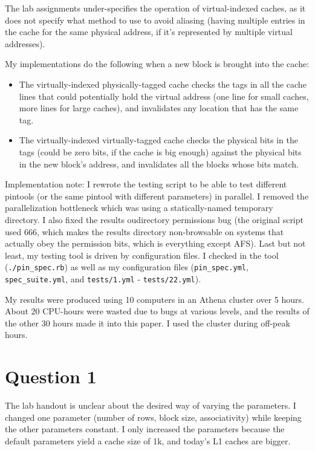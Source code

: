 The lab assignments under-specifies the operation of virtual-indexed caches, as
it does not specify what method to use to avoid aliasing (having multiple
entries in the cache for the same physical address, if it's represented by
multiple virtual addresses).

My implementations do the following when a new block is brought into the cache:
\begin{itemize}
  \item The virtually-indexed physically-tagged cache checks the tags in all
  the cache lines that could potentially hold the virtual address (one line for
  small caches, more lines for large caches), and invalidates any location that
  has the same tag.
  \item The virtually-indexed virtually-tagged cache checks the physical bits
  in the tags (could be zero bits, if the cache is big enough) against the
  physical bits in the new block's address, and invalidates all the blocks
  whose bits match.
\end{itemize}

Implementation note: I rewrote the testing script to be able to test different
pintools (or the same pintool with different parameters) in parallel. I removed
the parallelization bottleneck which was using a statically-named temporary
directory. I also fixed the results oudirectory permissions bug (the original
script used 666, which makes the results directory non-browsable on systems
that actually obey the permission bits, which is everything except AFS). Last
but not least, my testing tool is driven by configuration files. I checked in
the tool (\texttt{./pin\_spec.rb}) as well as my configuration files
(\texttt{pin\_spec.yml}, \texttt{spec\_suite.yml}, and \texttt{tests/1.yml} -
\texttt{tests/22.yml}).

My results were produced using 10 computers in an Athena cluster over 5 hours.
About 20 CPU-hours were wasted due to bugs at various levels, and the results
of the other 30 hours made it into this paper. I used the cluster during
off-peak hours.

\section{Question 1}
The lab handout is unclear about the desired way of varying the parameters. I
changed one parameter (number of rows, block size, associativity) while keeping
the other parameters constant. I only increased the parameters because the
default parameters yield a cache size of 1k, and today's L1 caches are bigger.

